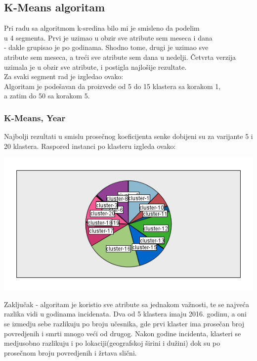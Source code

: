 \documentclass[
	12pt,			
	openright,		
	oneside,			
	a4paper,		
	english,			
	]{article}
\begin{document}
\subsection{K-Means algoritam}
    Pri radu sa algoritmom k-sredina bilo mi je smisleno da 
    podelim\\ u 4 segmenta. Prvi je uzimao u obzir sve atribute 
    sem meseca i dana\\ - dakle grupisao je po godinama. Shodno tome,  drugi je uzimao sve\\ atribute sem meseca, a treći sve atribute  sem dana u nedelji. Četvrta verzija uzimala je u obzir sve
    atribute, i postigla najlošije rezultate. \\
    Za svaki segment rad je izgledao ovako: \\
    Algoritam je podešavan da proizvede od 5 do 15 klastera sa  korakom 1, \\a zatim do 50 sa korakom 5.
    
    \subsubsection{K-Means, Year}
    Najbolji rezultati u smislu prosečnog koeficijenta senke dobijeni  su za varijante 5 i 20 klastera.
    Raspored instanci po klasteru izgleda ovako: 
    \begin{center}
    \includegraphics[width = 15cm]{Slike/KMeans_Year20.png}
    \end{center}
    
    Zaključak - algoritam je koristio sve atribute sa jednakom važnosti, te se najveća razlika vidi u godinama incidenata.
    Dva od 5 klastera imaju 2016. godinu, a oni se izmedju sebe
    razlikuju po broju učesnika, gde prvi klaster ima prosečan broj
    povredjenih i smrti mnogo veći od drugog. Nakon godine incidenta, klasteri se medjusobno razlikuju i po lokaciji(geografskoj širini i dužini) dok su po prosečnom broju povredjenih i žrtava slični.
    
\end{document}

